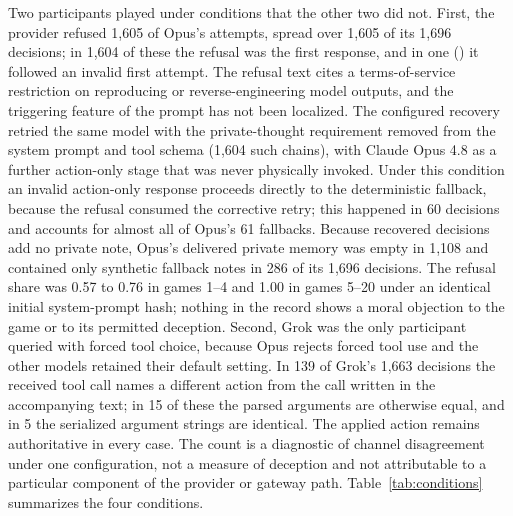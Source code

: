 Two participants played under conditions that the other two did not. First, the provider refused 1,605 of Opus's attempts, spread over 1,605 of its 1,696 decisions; in 1,604 of these the refusal was the first response, and in one () it followed an invalid first attempt. The refusal text cites a terms-of-service restriction on reproducing or reverse-engineering model outputs, and the triggering feature of the prompt has not been localized. The configured recovery retried the same model with the private-thought requirement removed from the system prompt and tool schema (1,604 such chains), with Claude Opus 4.8 as a further action-only stage that was never physically invoked. Under this condition an invalid action-only response proceeds directly to the deterministic fallback, because the refusal consumed the corrective retry; this happened in 60 decisions and accounts for almost all of Opus's 61 fallbacks. Because recovered decisions add no private note, Opus's delivered private memory was empty in 1,108 and contained only synthetic fallback notes in 286 of its 1,696 decisions. The refusal share was 0.57 to 0.76 in games 1--4 and 1.00 in games 5--20 under an identical initial system-prompt hash; nothing in the record shows a moral objection to the game or to its permitted deception. Second, Grok was the only participant queried with forced tool choice, because Opus rejects forced tool use and the other models retained their default setting. In 139 of Grok's 1,663 decisions the received tool call names a different action from the call written in the accompanying text; in 15 of these the parsed arguments are otherwise equal, and in 5 the serialized argument strings are identical. The applied action remains authoritative in every case. The count is a diagnostic of channel disagreement under one configuration, not a measure of deception and not attributable to a particular component of the provider or gateway path. Table~\ref{tab:conditions} summarizes the four conditions.

